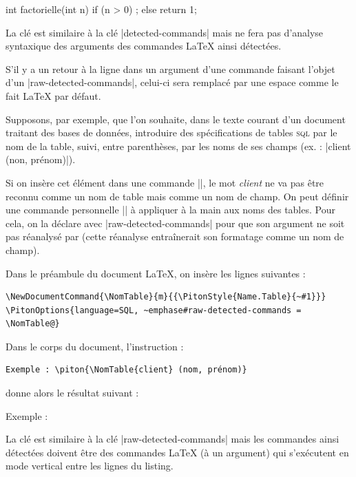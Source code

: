\documentclass[dvipsnames,svgnames]{article}
\begin{document}
\begin{Piton}[language=C]
int factorielle(int n)
  {
    if (n > 0)  ;
    else return 1;
  }
\end{Piton}

\bigskip
La clé  est similaire à la clé |detected-commands| mais
 ne fera pas d'analyse syntaxique des arguments des commandes LaTeX ainsi
détectées.

S'il y a un retour à la ligne dans un argument d'une commande faisant l'objet d'un
|raw-detected-commands|, celui-ci sera remplacé par une espace comme le fait LaTeX par
défaut. 

\medskip
Supposons, par exemple, que l'on souhaite, dans le texte courant d'un document
traitant des bases de données, introduire des spécifications de tables
\textsc{sql} par le nom de la table, suivi, entre parenthèses, par les noms de
ses champs (ex. : |client (non, prénom)|).

Si on insère cet élément dans une commande |\piton|, le mot \emph{client} ne va pas
être reconnu comme un nom de table mais comme un nom de champ. On peut définir
une commande personnelle |\NomTable|
à appliquer à la main aux noms des tables. Pour cela, on la déclare avec
|raw-detected-commands| pour que son argument ne soit pas réanalysé par 
(cette réanalyse entraînerait son formatage comme un nom de champ).


\medskip
Dans le préambule du document LaTeX, on insère les lignes suivantes :
\begin{Verbatim}
\NewDocumentCommand{\NomTable}{m}{{\PitonStyle{Name.Table}{~#1}}}
\PitonOptions{language=SQL, ~emphase#raw-detected-commands = \NomTable@}
\end{Verbatim}

Dans le corps du document, l'instruction :

\begin{Verbatim}
Exemple : \piton{\NomTable{client} (nom, prénom)}
\end{Verbatim}


donne alors le résultat suivant :

\smallskip
\begingroup
{}%
Exemple : 
\endgroup


\bigskip
La clé  est similaire à la clé
|raw-detected-commands| mais les commandes ainsi détectées doivent être des
commandes LaTeX (à un argument) qui s'exécutent en mode vertical entre les lignes
du listing.
\end{document}
